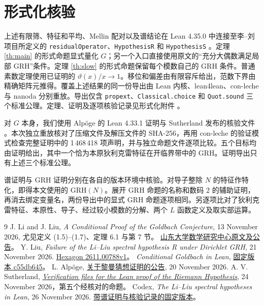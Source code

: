 \documentclass[UTF8,a4paper,11pt,fontset=windows]{ctexart}
\newcommand{\GRH}{\mathrm{GRH}}
\begin{document}
\clearpage
\section*{形式化核验}
上述有限筛、特征和平均、Mellin 配对以及谱结论在 Lean 4.35.0 中连接至李--刘项目所定义的 \texttt{residualOperator}、\texttt{HypothesisR} 和 \texttt{HypothesisS} \cite{LLLean}。定理 \ref{th:main} 的形式命题显式量化 \(G\)；另一个入口直接使用原文的“充分大偶数满足局部 GRH”条件。定理 \ref{th:slow} 的形式命题保留每个模数自己的 GRH 条件。普通素数定理使用已证明的 \(\vartheta(x)/x\to1\)。移位和偏差由有限容斥给出，范数下界由精确矩阵元推得。覆盖上述结果的同一份导出由 Lean 内核、lean4lean、con-leche 与 nanoda 分别重放。导出仅含 \texttt{propext}、\texttt{Classical.choice} 和 \texttt{Quot.sound} 三个标准公理。定理、证明及逐项核验记录见形式化附件 \cite{ThisLean}。

对 \(G\) 本身，我们使用 Alpöge 的 Lean 4.33.1 证明与 Sutherland 发布的核验文件 \cite{GRH}。本次独立重放核对了压缩文件及解压文件的 SHA-256，再用 con-leche 的验证模式检查完整证明中的 1\,468\,418 项声明，并与独立命题文件逐项比较。五个目标均由证明给出，其中一个恰为本原狄利克雷特征在开临界带中的 GRH。证明导出只有上述三个标准公理。

谱证明与 GRH 证明分别在各自的版本环境中核验。对导子整除 \(N\) 的特征作特化，即得本文使用的 \(\GRH(N)\)。展开 GRH 命题的名称和数码 \(2\) 的辅助证明，再消去绑定变量名，两份导出中的显式 GRH 命题逐项相同。另逐项比对了狄利克雷特征、本原性、导子、经过较小模数的分解、两个 \(L\) 函数定义及取实部运算。

\begin{thebibliography}{9}
 J. Li and J. Liu, \textit{A Conditional Proof of the Goldbach Conjecture},
13 November 2026, 尤见定义 (1.5)--(1.7)、定理 6.1 与第 7 节。
\href{https://mrc.sdu.edu.cn/english/info/1018/1514.htm}{山东大学数学研究中心原文及公告}。
 Y. Liu, \textit{Failure of the Li--Liu spectral hypothesis R under Dirichlet GRH},
21 November 2026. \href{https://hexagonmath.org/2611.00788v1}{Hexagon 2611.00788v1}。
 \textit{Conditional Goldbach in Lean},
\href{https://github.com/subfish-zhou/conditional-goldbach-lean/tree/c55db645f3b4aed00374fe4aa1fcee2428c88c4b}{固定版本 c55db645}。
 L. Alpöge, \href{https://alpo.ge/remark.pdf}{关于黎曼猜想证明的公告}, 20 November 2026.
A. V. Sutherland, \href{https://math.mit.edu/~drew/grh/}{\textit{Verification files for the Lean proof of the Riemann Hypothesis}},
24 November 2026，第五个经核对的命题。
 Codex, \textit{The Li--Liu spectral hypotheses in Lean}, 26 November 2026.
\href{https://github.com/RaymondVoldemortFu/li-liu-spectral-hypotheses-lean/tree/eb458a4}{带谱证明与核验记录的固定版本}。
\end{thebibliography}
\end{document}
